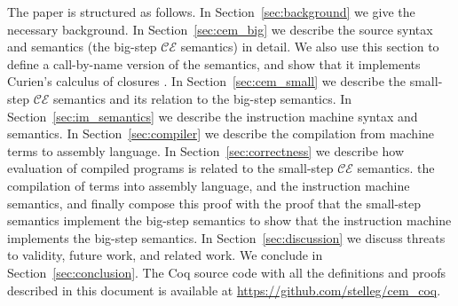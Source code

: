 The paper is structured as follows. In Section~\ref{sec:background} we give the
necessary background. In Section~\ref{sec:cem_big} we describe the source syntax
and semantics (the big-step $\mathcal{CE}$ semantics) in detail.  We also use
this section to define a call-by-name version of the semantics, and
show that it implements Curien's calculus of closures \cite{curien1991abstract}.  In
Section~\ref{sec:cem_small} we describe the small-step $\mathcal{CE}$ semantics
and its relation to the big-step semantics. In Section~\ref{sec:im_semantics}
we describe the instruction machine syntax and semantics. In
Section~\ref{sec:compiler} we describe the compilation from machine terms to
assembly language. In Section~\ref{sec:correctness} we describe how evaluation
of compiled programs is related to the small-step $\mathcal{CE}$ semantics. the
compilation of terms into assembly language, and the instruction machine
semantics, and finally compose this proof with the proof that the small-step
semantics implement the big-step semantics to show that the instruction machine
implements the big-step semantics. In Section~\ref{sec:discussion} we discuss
threats to validity, future work, and related work. We conclude in
Section~\ref{sec:conclusion}. The Coq source code with all the definitions and
proofs described in this document is available at
\url{https://github.com/stelleg/cem\_coq}. 
